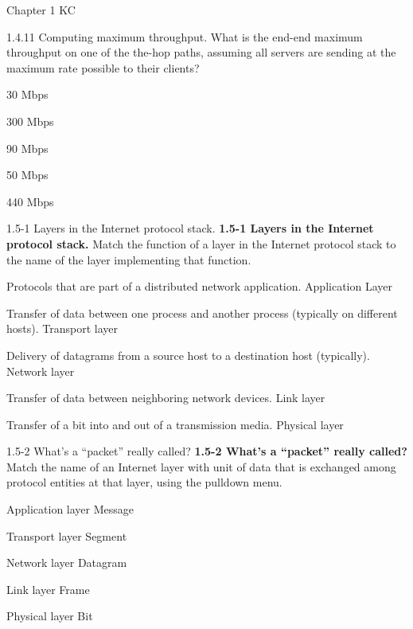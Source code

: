 \documentclass[a4paper]{article}
\begin{document}
\begin{quiz}{Chapter 1 KC}
\begin{multi}[points=1,shuffle=true]{1.4.11 Computing maximum throughput.}
What is the end-end maximum throughput on one of the the-hop paths, assuming all servers are sending at the maximum rate possible to their clients?
\item* 30 Mbps
\item 300 Mbps
\item 90 Mbps
\item 50 Mbps
\item 440 Mbps
\end{multi}

\begin{matching}[points=1,shuffle=true]{1.5-1 Layers in the Internet protocol stack.}
\textbf{1.5-1 Layers in the Internet protocol stack.}
Match the function of a layer in the Internet protocol stack to the name of the layer implementing that function.

\item Protocols that are part of a distributed network application. \answer Application Layer
\item Transfer of data between one process and another process (typically on different hosts). \answer Transport layer
\item Delivery of datagrams from a source host to a destination host (typically). \answer Network layer
\item Transfer of data between neighboring network devices. \answer Link layer
\item Transfer of a bit into and out of a transmission media. \answer Physical layer
\end{matching}

\begin{matching}[points=1,shuffle=true]{1.5-2 What's a ``packet'' really called?}
\textbf{1.5-2 What's a ``packet'' really called?}
Match the name of an Internet layer with unit of data that is exchanged among protocol entities at that layer, using the pulldown menu.
\item Application layer \answer Message
\item Transport layer \answer Segment
\item Network layer \answer Datagram
\item Link layer \answer Frame
\item Physical layer \answer Bit
\end{matching}


\end{quiz}
\end{document}
